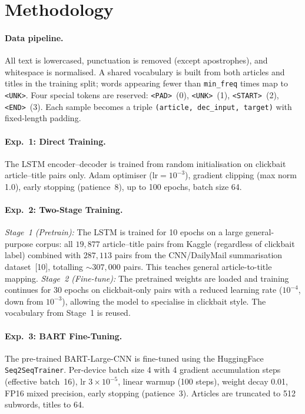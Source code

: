 \documentclass{article}
\begin{document}
\section{Methodology}

\paragraph{Data pipeline.}
All text is lowercased, punctuation is removed (except apostrophes), and whitespace is normalised.
A shared vocabulary is built from both articles and titles in the training split; words appearing fewer than \texttt{min\_freq} times map to \texttt{<UNK>}.
Four special tokens are reserved: \texttt{<PAD>}~(0), \texttt{<UNK>}~(1), \texttt{<START>}~(2), \texttt{<END>}~(3).
Each sample becomes a triple \texttt{(article, dec\_input, target)} with fixed-length padding.

\paragraph{Exp.~1: Direct Training.}
The LSTM encoder--decoder is trained from random initialisation on clickbait article--title pairs only.
Adam optimiser ($\text{lr} = 10^{-3}$), gradient clipping (max norm 1.0), early stopping (patience~8), up to 100 epochs, batch size 64.

\paragraph{Exp.~2: Two-Stage Training.}
\emph{Stage~1 (Pretrain):} The LSTM is trained for 10 epochs on a large general-purpose corpus: all $19{,}877$ article--title pairs from Kaggle (regardless of clickbait label) combined with $287{,}113$ pairs from the CNN/DailyMail summarisation dataset~[10], totalling ${\sim}307{,}000$ pairs.
This teaches general article-to-title mapping.
\emph{Stage~2 (Fine-tune):} The pretrained weights are loaded and training continues for 30 epochs on clickbait-only pairs with a reduced learning rate ($10^{-4}$, down from $10^{-3}$), allowing the model to specialise in clickbait style.
The vocabulary from Stage~1 is reused.

\paragraph{Exp.~3: BART Fine-Tuning.}
The pre-trained BART-Large-CNN is fine-tuned using the HuggingFace \texttt{Seq2SeqTrainer}.
Per-device batch size 4 with 4 gradient accumulation steps (effective batch~16), lr $3{\times}10^{-5}$, linear warmup (100 steps), weight decay 0.01, FP16 mixed precision, early stopping (patience~3).
Articles are truncated to 512 subwords, titles to 64.
\end{document}
